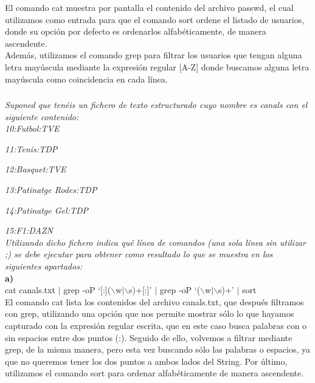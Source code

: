 \documentclass[spanish]{article}
\begin{document}
El comando cat muestra por pantalla el contenido del archivo
passwd, el cual utilizamos como entrada para que el comando
sort ordene el listado de usuarios, donde su opción por
defecto es ordenarlos alfabéticamente, de manera
ascendente.\\

Además, utilizamos el comando grep para filtrar los usuarios
que tengan alguna letra mayúscula mediante la expresión
regular [A-Z] donde buscamos alguna letra mayúscula como
coincidencia en cada línea.

\newpage 

\subsubsection{}

\textit{Suponed que tenéis un fichero de texto estructurado
cuyo nombre es canals con el siguiente contenido:}\\

\textit{10:Futbol:TVE}

\textit{11:Tenis:TDP}

\textit{12:Basquet:TVE}

\textit{13:Patinatge Rodes:TDP}

\textit{14:Patinatge Gel:TDP}

\textit{15:F1:DAZN}\\

\textit{Utilizando dicho fichero indica qué línea de
comandos (una sola línea sin utilizar ;) se debe ejecutar
para obtener como resultado lo que se muestra en los
siguientes apartados:}\\

\textbf{a)}\\

cat canals.txt $\vert$ grep -oP
`[:]($\backslash$w$\vert$$\backslash$s)+[:]' $\vert$ grep
-oP `($\backslash$w$\vert$$\backslash$s)+' $\vert$ sort\\

El comando cat lista los contenidos del archivo canals.txt,
que después filtramos con grep, utilizando una opción que
nos permite mostrar sólo lo que hayamos capturado con la
expresión regular escrita, que en este caso busca palabras
con o sin espacios entre dos puntos (:). Seguido de ello,
volvemos a filtrar mediante grep, de la misma manera, pero
esta vez buscando sólo las palabras o espacios, ya que no
queremos tener los dos puntos a ambos lados del String. Por
último, utilizamos el comando sort para ordenar
alfabéticamente de manera ascendente.\\
\end{document}
